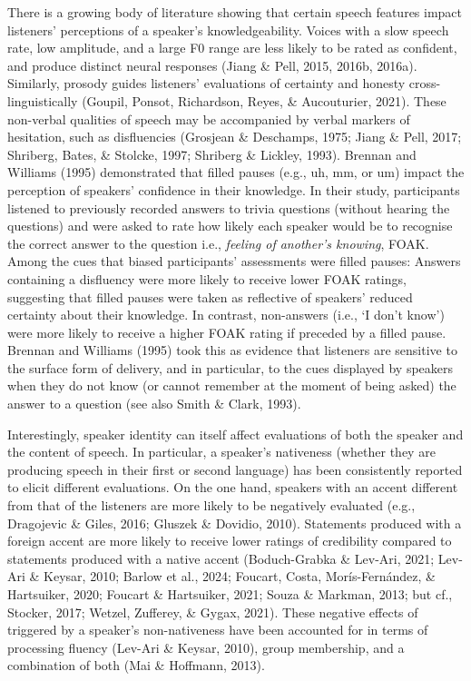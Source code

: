 \documentclass[
  man,floatsintext]{apa7}
\begin{document}
There is a growing body of literature showing that certain speech features impact listeners' perceptions of a speaker's knowledgeability. Voices with a slow speech rate, low amplitude, and a large F0 range are less likely to be rated as confident, and produce distinct neural responses (Jiang \& Pell, 2015, 2016b, 2016a). Similarly, prosody guides listeners' evaluations of certainty and honesty cross-linguistically (Goupil, Ponsot, Richardson, Reyes, \& Aucouturier, 2021). These non-verbal qualities of speech may be accompanied by verbal markers of hesitation, such as disfluencies (Grosjean \& Deschamps, 1975; Jiang \& Pell, 2017; Shriberg, Bates, \& Stolcke, 1997; Shriberg \& Lickley, 1993). Brennan and Williams (1995) demonstrated that filled pauses (e.g., uh, mm, or um) impact the perception of speakers' confidence in their knowledge. In their study, participants listened to previously recorded answers to trivia questions (without hearing the questions) and were asked to rate how likely each speaker would be to recognise the correct answer to the question i.e., \emph{feeling of another's knowing}, FOAK. Among the cues that biased participants' assessments were filled pauses: Answers containing a disfluency were more likely to receive lower FOAK ratings, suggesting that filled pauses were taken as reflective of speakers' reduced certainty about their knowledge. In contrast, non-answers (i.e., `I don't know') were more likely to receive a higher FOAK rating if preceded by a filled pause. Brennan and Williams (1995) took this as evidence that listeners are sensitive to the surface form of delivery, and in particular, to the cues displayed by speakers when they do not know (or cannot remember at the moment of being asked) the answer to a question (see also Smith \& Clark, 1993).

Interestingly, speaker identity can itself affect evaluations of both the speaker and the content of speech. In particular, a speaker's nativeness (whether they are producing speech in their first or second language) has been consistently reported to elicit different evaluations. On the one hand, speakers with an accent different from that of the listeners are more likely to be negatively evaluated (e.g., Dragojevic \& Giles, 2016; Gluszek \& Dovidio, 2010). Statements produced with a foreign accent are more likely to receive lower ratings of credibility compared to statements produced with a native accent (Boduch-Grabka \& Lev-Ari, 2021; Lev-Ari \& Keysar, 2010; Barlow et al., 2024; Foucart, Costa, Morís-Fernández, \& Hartsuiker, 2020; Foucart \& Hartsuiker, 2021; Souza \& Markman, 2013; but cf., Stocker, 2017; Wetzel, Zufferey, \& Gygax, 2021). These negative effects of triggered by a speaker's non-nativeness have been accounted for in terms of processing fluency (Lev-Ari \& Keysar, 2010), group membership, and a combination of both (Mai \& Hoffmann, 2013).
\end{document}
